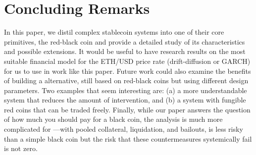 
\section{Concluding Remarks}

In this paper, we distil complex stablecoin systems into one of their core primitives, the red-black coin and provide a detailed study of its characteristics and possible extensions. It would be useful to have research results on the most suitable financial model for the ETH/USD price rate (\eg drift-diffusion or GARCH) for us to use in work like this paper. Future work could also examine the benefits of building a \dai alternative, still based on red-black coins but using different design parameters. Two examples that seem interesting are: (a) a more understandable system that reduces the amount of intervention, and (b) a system with fungible red coins that can be traded freely. Finally, while our paper answers the question of how much you should pay for a black coin, the analysis is much more complicated for \dai---with pooled collateral, liquidation, and bailouts, \dai is less risky than a simple black coin but the risk that these countermeasures systemically fail is not zero.

